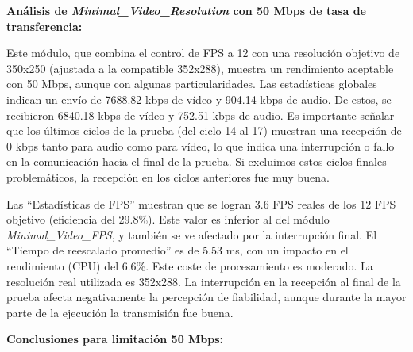 \vspace{\baselineskip}

\textbf{Análisis de \textit{Minimal\_Video\_Resolution} con 50 Mbps de tasa de transferencia:}
\vspace{\baselineskip}

Este módulo, que combina el control de FPS a 12 con una resolución objetivo de 350x250 (ajustada a la compatible 352x288), muestra un rendimiento aceptable con 50 Mbps, aunque con algunas particularidades. Las estadísticas globales indican un envío de 7688.82 kbps de vídeo y 904.14 kbps de audio. De estos, se recibieron 6840.18 kbps de vídeo y 752.51 kbps de audio. Es importante señalar que los últimos ciclos de la prueba (del ciclo 14 al 17) muestran una recepción de 0 kbps tanto para audio como para vídeo, lo que indica una interrupción o fallo en la comunicación hacia el final de la prueba. Si excluimos estos ciclos finales problemáticos, la recepción en los ciclos anteriores fue muy buena.

Las ``Estadísticas de FPS'' muestran que se logran 3.6 FPS reales de los 12 FPS objetivo (eficiencia del 29.8\%). Este valor es inferior al del módulo \textit{Minimal\_Video\_FPS}, y también se ve afectado por la interrupción final. El ``Tiempo de reescalado promedio'' es de 5.53 ms, con un impacto en el rendimiento (CPU) del 6.6\%. Este coste de procesamiento es moderado. La resolución real utilizada es 352x288. La interrupción en la recepción al final de la prueba afecta negativamente la percepción de fiabilidad, aunque durante la mayor parte de la ejecución la transmisión fue buena.
\vspace{\baselineskip}

\textbf{Conclusiones para limitación 50 Mbps:}

